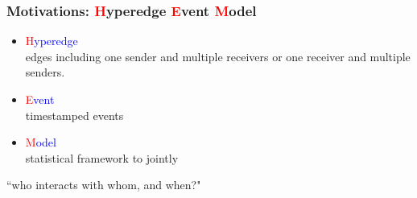 \documentclass{beamer}
\begin{document}
\begin{frame}
		\frametitle{Motivations: \textcolor{red}{H}yperedge \textcolor{red}{E}vent \textcolor{red}{M}odel}
		\begin{itemize}
			\item \textcolor{red}{H}\textcolor{blue}{yperedge}\\
			edges including one sender and multiple receivers or one receiver and multiple
senders.
			\item \textcolor{red}{E}\textcolor{blue}{vent}\\
			timestamped events
			\item  \textcolor{red}{M}\textcolor{blue}{odel}\\
			statistical framework to jointly \\
		\end{itemize}
		\centering\Large
		``who interacts with whom, and when?"
\end{frame}
\end{document}
